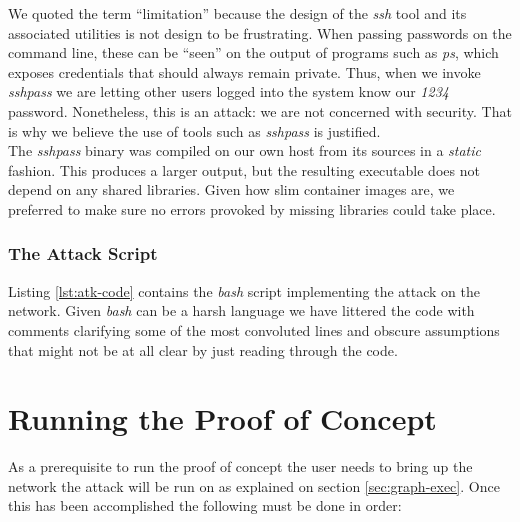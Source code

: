             We quoted the term ``limitation'' because the design of the \textit{ssh} tool and its associated utilities is not design to be frustrating. When passing passwords on the command line, these can be ``seen'' on the output of programs such as \textit{ps}, which exposes credentials that should always remain private. Thus, when we invoke \textit{sshpass} we are letting other users logged into the system know our \textit{1234} password. Nonetheless, this is an attack: we are not concerned with security. That is why we believe the use of tools such as \textit{sshpass} is justified.\\

            The \textit{sshpass} binary was compiled on our own host from its sources \cite{bib:src-sshpass} in a \textit{static} fashion. This produces a larger output, but the resulting executable does not depend on any shared libraries. Given how slim container images are, we preferred to make sure no errors provoked by missing libraries could take place.\\

        \subsubsection{The Attack Script}
            Listing \ref{lst:atk-code} contains the \textit{bash} script implementing the attack on the network. Given \textit{bash} can be a harsh language we have littered the code with comments clarifying some of the most convoluted lines and obscure assumptions that might not be at all clear by just reading through the code.

            

    \section{Running the Proof of Concept}
        As a prerequisite to run the proof of concept the user needs to bring up the network the attack will be run on as explained on section \ref{sec:graph-exec}. Once this has been accomplished the following must be done in order:


